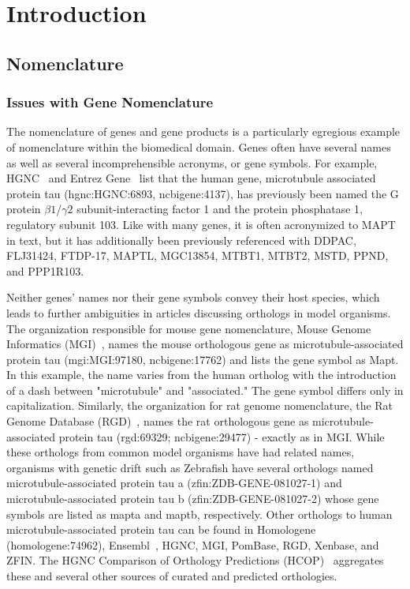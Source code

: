 \chapter{Introduction}

\section{Nomenclature}

\subsection{Issues with Gene Nomenclature}

The nomenclature of genes and gene products is a particularly egregious example of nomenclature within the biomedical domain.
Genes often have several names as well as several incomprehensible acronyms, or gene symbols.
For example, HGNC~\cite{Yates2017} and Entrez Gene~\cite{Maglott2011} list that the human gene, microtubule associated protein tau (hgnc:HGNC:6893, ncbigene:4137), has previously been named the G protein
$\beta1$/$\gamma2$ subunit-interacting factor 1 and the protein phosphatase 1,
regulatory subunit 103.
Like with many genes, it is often acronymized to MAPT in text, but it has additionally been previously referenced with DDPAC, FLJ31424, FTDP-17, MAPTL, MGC13854, MTBT1, MTBT2, MSTD, PPND, and PPP1R103.

Neither genes' names nor their gene symbols convey their host species, which leads to further ambiguities in articles discussing orthologs in model organisms.
The organization responsible for mouse gene nomenclature, Mouse Genome Informatics (MGI)~\cite{Blake2017}, names the mouse orthologous gene as microtubule-associated protein tau (mgi:MGI:97180, ncbigene:17762) and lists the gene symbol as Mapt.
In this example, the name varies from the human ortholog with the introduction of a dash between "microtubule" and "associated."
The gene symbol differs only in capitalization.
Similarly, the organization for rat genome nomenclature, the Rat Genome Database (RGD)~\cite{Shimoyama2015}, names the rat orthologous gene as microtubule-associated protein tau (rgd:69329; ncbigene:29477) - exactly as in MGI.
While these orthologs from common model organisms have had related names, organisms with genetic drift such as Zebrafish have several orthologs named microtubule-associated protein tau a (zfin:ZDB-GENE-081027-1) and microtubule-associated protein tau b (zfin:ZDB-GENE-081027-2) whose gene symbols are listed as mapta and maptb, respectively.
Other orthologs to human microtubule-associated protein tau can be found in Homologene (homologene:74962), Ensembl~\cite{Zerbino2018}, HGNC, MGI, PomBase, RGD, Xenbase, and ZFIN.
The HGNC Comparison of Orthology Predictions (HCOP)~\cite{Wright2005} aggregates these and several other sources of curated and predicted orthologies.

